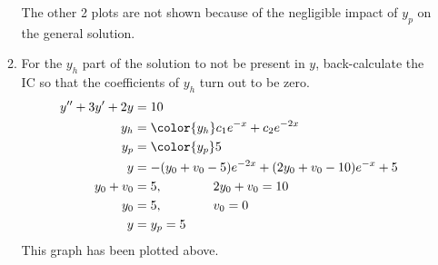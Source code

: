 \begin{enumerate}
\begin{enumerate}
                    \begin{figure}[H]
                        \centering
                    \end{figure}
                    The other 2 plots are not shown because of the negligible impact of $ y_{p} $ on the
                    general solution.

              \item For the $ y_{h} $ part of the solution to not be present in $ y $, back-calculate
                    the IC so that the coefficients of $ y_{h} $ turn out to be zero.
                    \begin{align}
                        y'' + 3y' + 2y & = 10                                                            \\
                        y_{h}          & = \color{y_h} c_{1}e^{-x} + c_{2}e^{-2x}                        \\
                        y_{p}          & = \color{y_p} 5                                                 \\
                        y              & = -(y_{0} + v_{0} - 5)e^{-2x} + (2y_{0} + v_{0} - 10)e^{-x} + 5 \\
                        y_{0} + v_{0}  & = 5, \qquad\qquad 2y_{0}  + v_{0} = 10                          \\
                        y_{0}          & = 5, \qquad \qquad v_{0} = 0                                    \\
                        y              & = y_{p} = 5
                    \end{align}
                    This graph has been plotted above.


\end{enumerate}
\end{enumerate}

